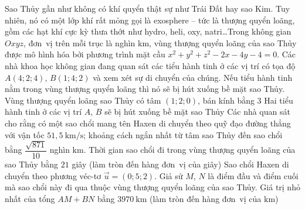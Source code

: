 \begin{ex}%
	Sao Thủy gần như không có khí quyển thật sự như Trái Đất hay sao Kim. Tuy nhiên, nó có một lớp khí rất mỏng gọi là exosphere -- tức là thượng quyển loãng, gồm các hạt khí cực kỳ thưa thớt như hydro, heli, oxy, natri\ldots Trong không gian $Oxyz$, đơn~vị trên mỗi trục là nghìn $\mathrm{km}$, vùng thượng quyển loãng của sao Thủy được mô hình hóa bởi phương trình mặt cầu $x^2+y^2+z^2-2x-4y-4=0$. Các nhà khoa học không gian đang quan sát các tiểu hành tinh ở các vị trí có tọa độ $A(4;2;4)$, $B(1;4;2)$ và xem xét sự di chuyển của chúng. Nếu tiểu hành tinh nằm trong vùng  thượng quyển loãng thì nó sẽ bị hút xuống bề mặt sao Thủy.
	 \choiceTF
		{\True Vùng thượng quyển loãng sao Thủy có tâm $(1;2;0)$, bán kính  bằng $3$}
		{Hai tiểu hành tinh ở các vị  trí $A$, $B$ sẽ bị hút xuống bề mặt sao Thủy}
		{\True Các nhà quan sát cho rằng có một sao chổi mang tên Haxen di chuyển theo quỹ đạo đường thẳng với vận tốc $51{,}5~\mathrm{km/s}$; khoảng cách ngắn nhất từ tâm  sao Thủy đến sao chổi bằng $\dfrac{\sqrt{871}}{10}$ nghìn $\mathrm{km}$. Thời gian sao chổi đi trong vùng thượng quyển loãng của sao Thủy bằng $21$ giây (làm tròn đến hàng đơn~vị của giây)}
		{\True Sao chổi Haxen di chuyển theo phương véc-tơ $\overrightarrow{u}=(0;5;2)$. Giả sử $M$, $N$ là điểm đầu và  điểm cuối mà sao chổi này đi qua thuộc vùng thượng quyển loãng của sao Thủy. Giá trị nhỏ nhất của tổng $AM+BN$ bằng $3970~\mathrm{km}$ (làm tròn đến hàng đơn~vị của $\mathrm{km}$)}
\end{ex}
